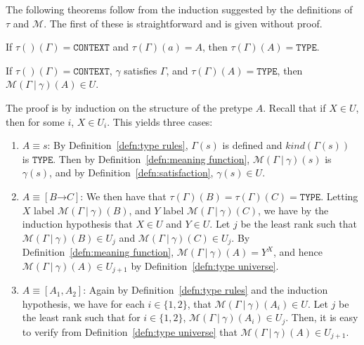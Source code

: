 \documentclass [12pt,twoside]{cslreport}
\newcommand{\thmbox}
   {{\ \hfill\hbox{%
      \vrule width1.0ex height1.0ex
   }\parfillskip 0pt }}
\newenvironment{proof}{{\bf Proof. }}{\thmbox}
\newcommand{\aro}{\mathord\rightarrow} %
\newcommand{\funtype}[2]{[#1 \aro #2]}
\newcommand{\tupletype}[1]{[#1]}
\newcommand{\tauGamma}[1]{\tau(\Gamma)(#1)}
\newcommand{\Mgamma}[1]{{\mathcal M}(\Gamma\vbar\gamma)(#1)}
\newcommand{\listwo}[2]{#1_{1}, #1_{2}}
\newcommand{\tttype}{\mathtt{TYPE}}
\newcommand{\ttcontext}{\mathtt{CONTEXT}}
\newcommand{\itkind}{\textit{kind}}
\newcommand{\vbar}{\ |\ }
\begin{document}
The following theorems follow from the induction suggested by the
definitions of $\tau$ and $\mathcal{M}$.  The first of these
is straightforward and is given without proof.
\begin{theorem}  \label{type construction}
If $\tau()(\Gamma) = \ttcontext$ and $\tauGamma{a} = A$, then
$\tauGamma{A} = \tttype$.
\end{theorem}
%
\begin{theorem}\label{simple-type-semantics}
 If $\tau()(\Gamma) = {\ttcontext}$, 
   $\gamma$ satisfies $\Gamma$, and
   $\tauGamma{A} = {\tttype{}} $, then 
$\Mgamma{A} \in U$\@.
\end{theorem}
\begin{proof}
The proof is by induction on the structure of the pretype $A$.
Recall that if $X\in U$, then for some $i$, $X \in U_i$\@.  
This yields three cases:
\begin{enumerate}
\item $A \equiv s$: By Definition~\ref{defn:type rules},
$\Gamma(s)$ is defined and $\itkind(\Gamma(s))$ is $\tttype$\@.
Then by Definition~\ref{defn:meaning function}, $\Mgamma{s}$
is $\gamma(s)$, and by Definition~\ref{defn:satisfaction},
$\gamma(s)\in U$\@.

\item $A\equiv \funtype{B}{C}$: We then have that $\tauGamma{B} =
\tauGamma{C} = \tttype$\@.  Letting $X$ label $\Mgamma{B}$, and $Y$ label
$\Mgamma{C}$, we have by the induction hypothesis that $X\in U$ and $Y\in
U$\@.  Let $j$ be the least rank such that $\Mgamma{B}\in U_j$ and
$\Mgamma{C}\in U_j$\@.  By Definition~\ref{defn:meaning function},
$\Mgamma{A} = Y^X$, and hence $\Mgamma{A} \in U_{j+1}$ by
Definition~\ref{defn:type universe}\@.

\item $A \equiv \tupletype{\listwo{A}{n}}$: Again by
Definition~\ref{defn:type rules} and the induction hypothesis, we have
for each $i \in \{1, 2\}$, that $\Mgamma{A_i}\in U$\@.  Let $j$ be the least
rank such that for $i\in \{1, 2\}$, $\Mgamma{A_i}\in U_j$\@.  Then,
it is easy to verify from Definition~\ref{defn:type universe} that
$\Mgamma{A}\in U_{j + 1}$\@.  
\end{enumerate}
\end{proof}
\end{document}
